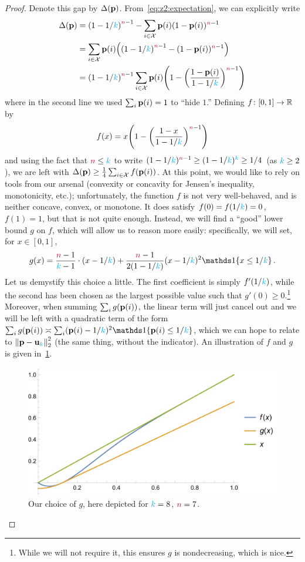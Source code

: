 \begin{proof}
Denote this gap by $\Delta(\mathbf{p})$. 
From~\eqref{eq:z2:expectation}, we can explicitly write
\begin{align*}
  \Delta(\p) 
  &= \Paren{1-1/\ab}^{\ns-1} - \sum_{i\in\domain} \p(i)(1-\p(i))^{\ns-1} \\
  &= \sum_{i\in\domain} \p(i)\Paren{ \Paren{1-1/\ab}^{\ns-1} - (1-\p(i))^{\ns-1} } \\
  &= \Paren{1-1/\ab}^{\ns-1}\sum_{i\in\domain} \p(i)\Paren{ 1 - \Paren{\frac{1-\p(i)}{1-1/\ab}}^{\ns-1} }
\end{align*}
where in the second line we used $\sum_i \mathbf{p}(i)=1$ to ``hide $1$.'' Defining $f\colon[0,1]\to\mathbb{R}$ by 
\[
  f(x) = x\Paren{ 1 - \Paren{\frac{1-x}{1-1/\ab}}^{\ns-1} }
\] and using the fact that ${\textcolor{purple}{n}} \leq {\textcolor{cyan}{k}}$  to write $(1-1/{\textcolor{cyan}{k}})^{{\textcolor{purple}{n}}-1} \geq (1-1/{\textcolor{cyan}{k}})^{{\textcolor{cyan}{k}}} \geq 1/4$ (as ${\textcolor{cyan}{k}} \geq 2$), we are left with
$
  \Delta(\mathbf{p}) \geq \frac{1}{4}\sum_{i\in\mathcal{X}} f(\mathbf{p}(i))
$. At this point, we would like to rely on tools from our arsenal (convexity or concavity for Jensen's inequality, monotonicity, etc.); unfortunately, the function $f$ is not very well-behaved, and is neither concave, convex, or monotone. It does satisfy $f(0)=f(1/{\textcolor{cyan}{k}})=0$, $f(1)=1$, but that is not quite enough. Instead, we will find a ``good'' lower bound $g$ on $f$, which will allow us to reason more easily: specifically, we will set, for $x\in[0,1]$,
\[
    g(x) = \frac{\ns-1}{\ab-1}\cdot (x-1/\ab) + \frac{\ns-1}{2(1-1/\ab)}(x-1/\ab)^2\indic{x\leq 1/\ab}\,.
\]
Let us demystify this choice a little. The first coefficient is simply $f'\Paren{1/\ab}$, while the second has been chosen as the largest possible value such that $g'(0)\geq 0$.\footnote{While we will not require it, this ensures $g$ is nondecreasing, which is nice.} Moreover, when summing $\sum_i g(\mathbf{p}(i))$, the linear term will just cancel out and we will be left with a quadratic term of the form $\sum_i g(\p(i)) \asymp \sum_i (\p(i)-1/\ab)^2\indic{\p(i)\leq 1/\ab}$, which we can hope to relate to $\normtwo{\p-\uniform_\ab}^2$ (the same thing, without the indicator). An illustration of $f$ and $g$ is given in~\cref{fig:z2:fg}.

\begin{figure}[ht]\centering
  \includegraphics[width=1.0\textwidth]{figures/fig-uniformity-z2-fg}
  \caption{\label{fig:z2:fg}Our choice of $g$, here depicted for ${\textcolor{cyan}{k}}=8$, ${\textcolor{purple}{n}}=7$.}
\end{figure}


\end{proof}
